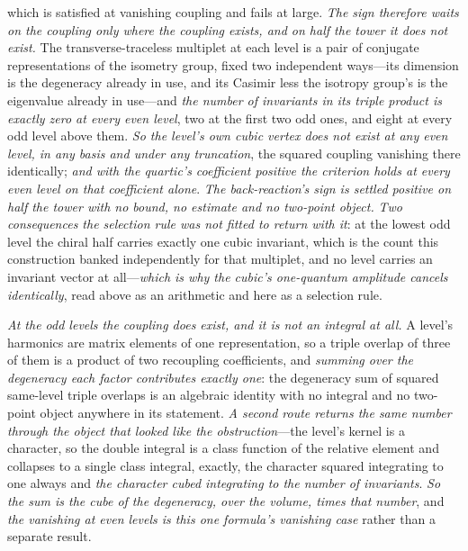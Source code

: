 \documentclass[11pt,a4paper]{article}
\theoremstyle{plain}
\theoremstyle{definition}
\theoremstyle{remark}
\begin{document}
which is satisfied at vanishing coupling and fails at large. \emph{The sign therefore waits on the coupling only where the coupling exists, and on half the tower it does
not exist.} The transverse-traceless multiplet at each level is a pair of conjugate representations of the
isometry group, fixed two independent ways---its dimension is the degeneracy already in use, and its Casimir
less the isotropy group's is the eigenvalue already in use---and \emph{the number of invariants in its triple
product is exactly zero at every even level}, two at the first two odd ones, and eight at every odd level
above them. \emph{So the level's own cubic vertex does not exist at any even level, in any basis and under any
truncation}, the squared coupling vanishing there identically; \emph{and with the quartic's coefficient
positive the criterion holds at every even level on that coefficient alone}. \emph{The back-reaction's sign is
settled positive on half the tower with no bound, no estimate and no two-point object.} \emph{Two consequences
the selection rule was not fitted to return with it}: at the lowest odd level the chiral half carries exactly
one cubic invariant, which is the count this construction banked independently for that multiplet, and no
level carries an invariant vector at all---\emph{which is why the cubic's one-quantum amplitude cancels
identically}, read above as an arithmetic and here as a selection rule.

\emph{At the odd levels the coupling does exist, and it is not an integral at all.} A level's harmonics are
matrix elements of one representation, so a triple overlap of three of them is a product of two recoupling
coefficients, and \emph{summing over the degeneracy each factor contributes exactly one}: the degeneracy sum
of squared same-level triple overlaps is an algebraic identity with no integral and no two-point object
anywhere in its statement. \emph{A second route returns the same number through the object that looked like
the obstruction}---the level's kernel is a character, so the double integral is a class function of the
relative element and collapses to a single class integral, exactly, the character squared integrating to one
always and \emph{the character cubed integrating to the number of invariants}. \emph{So the sum is the cube
of the degeneracy, over the volume, times that number}, and \emph{the vanishing at even levels is this one
formula's vanishing case} rather than a separate result.
\end{document}
